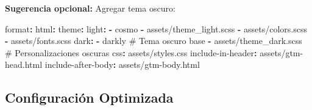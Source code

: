\documentclass[
  doc,
  floatsintext,
  longtable,
  a4paper,
  nolmodern,
  notxfonts,
  notimes,
  12pt,
  colorlinks=true,linkcolor=blue,citecolor=blue,urlcolor=blue]{apa7}
\newenvironment{Shaded}{\begin{snugshade}}{\end{snugshade}}
\newcommand{\AttributeTok}[1]{\textcolor[rgb]{0.40,0.45,0.13}{#1}}
\newcommand{\CommentTok}[1]{\textcolor[rgb]{0.37,0.37,0.37}{#1}}
\newcommand{\FunctionTok}[1]{\textcolor[rgb]{0.28,0.35,0.67}{#1}}
\newcommand{\KeywordTok}[1]{\textcolor[rgb]{0.00,0.23,0.31}{\textbf{#1}}}
\begin{document}
\textbf{Sugerencia opcional:} Agregar tema oscuro:

\begin{Shaded}
\begin{Highlighting}[]
\FunctionTok{format}\KeywordTok{:}
\AttributeTok{  }\FunctionTok{html}\KeywordTok{:}
\AttributeTok{    }\FunctionTok{theme}\KeywordTok{:}
\AttributeTok{      }\FunctionTok{light}\KeywordTok{:}
\AttributeTok{        }\KeywordTok{{-}}\AttributeTok{ cosmo}
\AttributeTok{        }\KeywordTok{{-}}\AttributeTok{ assets/theme\_light.scss}
\AttributeTok{        }\KeywordTok{{-}}\AttributeTok{ assets/colors.scss}
\AttributeTok{        }\KeywordTok{{-}}\AttributeTok{ assets/fonts.scss}
\AttributeTok{      }\FunctionTok{dark}\KeywordTok{:}
\AttributeTok{        }\KeywordTok{{-}}\AttributeTok{ darkly}\CommentTok{                     \# Tema oscuro base}
\AttributeTok{        }\KeywordTok{{-}}\AttributeTok{ assets/theme\_dark.scss}\CommentTok{     \# Personalizaciones oscuras}
\AttributeTok{    }\FunctionTok{css}\KeywordTok{:}\AttributeTok{ assets/styles.css}
\AttributeTok{    }\FunctionTok{include{-}in{-}header}\KeywordTok{:}\AttributeTok{ assets/gtm{-}head.html}
\AttributeTok{    }\FunctionTok{include{-}after{-}body}\KeywordTok{:}\AttributeTok{ assets/gtm{-}body.html}
\end{Highlighting}
\end{Shaded}

\subsection{Configuración Optimizada}\label{configuraciuxf3n-optimizada}
\end{document}
